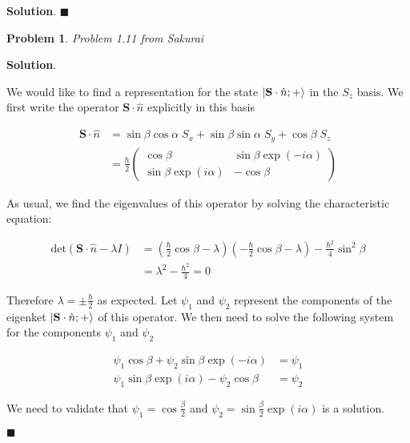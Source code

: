 \documentclass[12pt]{article}
\newtheorem{p}{Problem}
\theoremstyle{definition}
\newenvironment{s}{%
        \begin{trivlist} \item \textbf{Solution}. }{%
            \hspace*{\fill} $\blacksquare$\end{trivlist}}%
\begin{document}
{\begin{s}
\end{s}

\begin{p}
Problem 1.11 from Sakurai
\end{p}

\begin{s} 

We would like to find a representation for the state $\ket{\mathbf{S}\cdot\hat{n}; +}$ in the $S_{z}$ basis. We first write the operator $\mathbf{S}\cdot\hat{n}$ explicitly in this basis

\begin{align*}
\mathbf{S}\cdot\hat{n} &= \sin\beta\cos\alpha \; S_{x} +\sin\beta\sin\alpha\;S_{y} + \cos\beta\; S_{z}\\
&= \frac{\hbar}{2}\begin{pmatrix}
\cos\beta & \sin\beta\exp(-i\alpha)\\
\sin\beta\exp(i\alpha) & -\cos\beta
\end{pmatrix}
\end{align*}

As usual, we find the eigenvalues of this operator by solving the characteristic equation:

\begin{align*}
\mathrm{det}\left(\mathbf{S}\cdot\hat{n} - \lambda I\right) &= \left(\frac{\hbar}{2}\cos\beta - \lambda\right)\left(-\frac{\hbar}{2}\cos\beta - \lambda\right) - \frac{\hbar^{2}}{4}\sin^{2}\beta\\
&= \lambda^{2} - \frac{\hbar^{2}}{4} = 0
\end{align*}

Therefore $\lambda = \pm \frac{\hbar}{2}$ as expected. Let $\psi_{1}$ and $\psi_{2}$ represent the components of the eigenket $\ket{\mathbf{S}\cdot\hat{n}; +}$ of this operator. We then need to solve the following system for the components $\psi_{1}$ and $\psi_{2}$

\begin{align*}
\psi_{1}\cos\beta+\psi_{2}\sin\beta\exp(-i\alpha) &= \psi_{1}\\
\psi_{1}\sin\beta\exp(i\alpha) - \psi_{2}\cos\beta &= \psi_{2}
\end{align*}

We need to validate that $\psi_{1} = \cos\frac{\beta}{2}$ and $\psi_{2} = \sin\frac{\beta}{2}\exp(i\alpha)$ is a solution.


\end{s}
\end{document}
